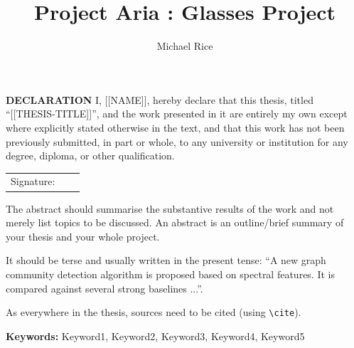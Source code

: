 \documentclass[a4paper,12pt]{Classes/RoboticsLaTeX}
\title{\Large{Project Aria : Glasses Project}}
\author{Michael Rice}
\begin{document}
	\begin{spacing}{1}
		\maketitle
	\end{spacing}
	
	\newpage\null\thispagestyle{empty}\newpage
	
	\setcounter{secnumdepth}{3}
	\setcounter{tocdepth}{3}
	
	\frontmatter
	
	\textbf{DECLARATION} 
	I, [[NAME]], hereby declare that this thesis, titled ``[[THESIS-TITLE]]'', and the work presented in it are entirely my own except where explicitly stated otherwise in the text, and that this work has not been previously submitted, in part or whole, to any university or institution for any degree, diploma, or other qualification. 
	\newline
	
	\begin{tabular}{@{}p{.5in}p{4in}@{}}
		Signature: & ~~\hrulefill \\
	\end{tabular}
	\newpage
	
	
	
	
	\begin{abstracts}
		The abstract should summarise the substantive results of the work and not merely list topics to be discussed. An abstract is an outline/brief summary of your thesis and your whole project. 
		
		It should be terse and usually written in the present tense: ``A new graph community detection algorithm is proposed based on spectral features. It is compared against several strong baselines ...''.
		
		As everywhere in the thesis, sources need to be cited (using \texttt{\textbackslash cite}).
		
		\textbf{Keywords: } Keyword1, Keyword2, Keyword3, Keyword4, Keyword5
	\end{abstracts}
	
	
	\tableofcontents
	\listoffigures
	\listoftables
	\printglossary[title=List of Acronyms,type=\acronymtype]
		
\end{document}
